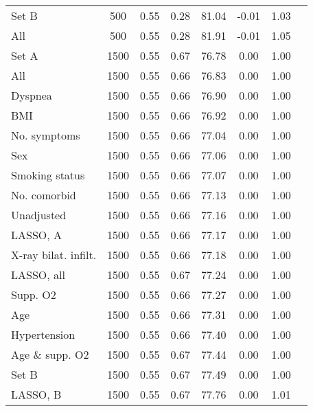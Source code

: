 \documentclass{article}
\begin{document}
{\begin{longtable}{lccccccc}
Set B & 500 & 0.55 & 0.28 & 81.04 & -0.01 & 1.03\\
All & 500 & 0.55 & 0.28 & 81.91 & -0.01 & 1.05\\ \midrule
Set A & 1500 & 0.55 & 0.67 & 76.78 & 0.00 & 1.00\\
All & 1500 & 0.55 & 0.66 & 76.83 & 0.00 & 1.00\\
Dyspnea & 1500 & 0.55 & 0.66 & 76.90 & 0.00 & 1.00\\
BMI & 1500 & 0.55 & 0.66 & 76.92 & 0.00 & 1.00\\
No. symptoms & 1500 & 0.55 & 0.66 & 77.04 & 0.00 & 1.00\\
Sex & 1500 & 0.55 & 0.66 & 77.06 & 0.00 & 1.00\\
Smoking status & 1500 & 0.55 & 0.66 & 77.07 & 0.00 & 1.00\\
No. comorbid & 1500 & 0.55 & 0.66 & 77.13 & 0.00 & 1.00\\
Unadjusted & 1500 & 0.55 & 0.66 & 77.16 & 0.00 & 1.00\\
LASSO, A & 1500 & 0.55 & 0.66 & 77.17 & 0.00 & 1.00\\
X-ray bilat. infilt. & 1500 & 0.55 & 0.66 & 77.18 & 0.00 & 1.00\\
LASSO, all & 1500 & 0.55 & 0.67 & 77.24 & 0.00 & 1.00\\
Supp. O2 & 1500 & 0.55 & 0.66 & 77.27 & 0.00 & 1.00\\
Age & 1500 & 0.55 & 0.66 & 77.31 & 0.00 & 1.00\\
Hypertension & 1500 & 0.55 & 0.66 & 77.40 & 0.00 & 1.00\\
Age \& supp. O2 & 1500 & 0.55 & 0.67 & 77.44 & 0.00 & 1.00\\
Set B & 1500 & 0.55 & 0.67 & 77.49 & 0.00 & 1.00\\
LASSO, B & 1500 & 0.55 & 0.67 & 77.76 & 0.00 & 1.01\\
\bottomrule
\hline
\end{longtable}
}

\clearpage
\end{document}
